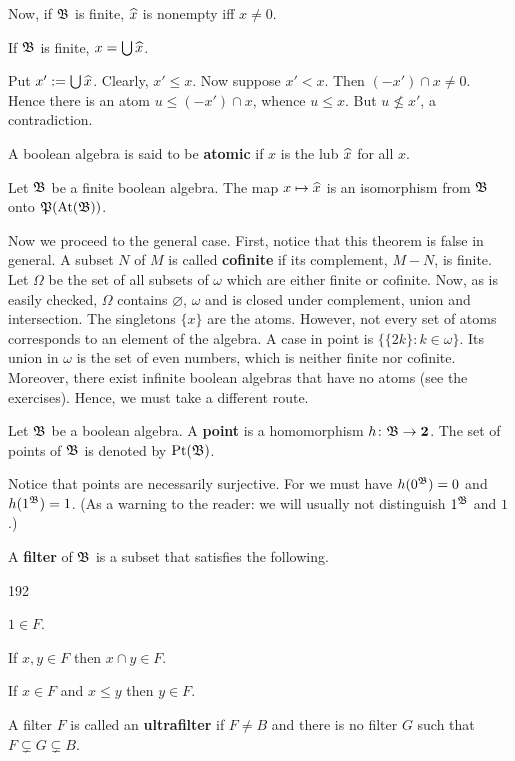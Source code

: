 Now, if $\mathfrak{B}$ is finite, $\widehat{x}$ is nonempty iff $x \neq 0$. 
\begin{lem}
If $\mathfrak{B}$ is finite, $x = \bigcup \widehat{x}$.
\end{lem}
\proofbeg
Put $x' := \bigcup \widehat{x}$. Clearly, $x' \leq x$. Now suppose 
$x' < x$. Then $(-x') \cap x \neq 0$. Hence there is an atom 
$u \leq (-x') \cap x$, whence $u \leq x$. But $u \nleq x'$, a 
contradiction.
\proofend

A boolean algebra is said to be \textbf{atomic} %
if $x$ is the lub $\widehat{x}$ for all $x$.
\begin{thm}
Let $\mathfrak{B}$ be a finite boolean algebra.  The map $x \mapsto \widehat{x}$
is an isomorphism from $\mathfrak{B}$ onto $\mathfrak{P}(\operatorname{At}(\mathfrak{B}))$.
\end{thm}
Now we proceed to the general case. First, notice that this theorem 
is false in general. A subset $N$ of $M$ is called \textbf{cofinite} 
if its complement, $M - N$, is finite. Let
$\Omega$ be the set of all subsets of $\omega$ which are
either finite or cofinite. Now, as is easily checked, $\Omega$
contains $\varnothing$, $\omega$ and is closed under complement,
union and intersection. The singletons $\{x\}$ are the atoms.
However, not every set of atoms corresponds to an element of the
algebra. A case in point is $\{\{2k\} : k \in \omega\}$. Its
union in $\omega$ is the set of even numbers,  which is neither
finite nor cofinite. Moreover, there exist infinite boolean
algebras that have no atoms (see the exercises). Hence, we must
take a different route.
\begin{defn}
\index{$\pt(\GA)$}%
Let $\mathfrak{B}$ be a boolean algebra. A \textbf{point} is a homomorphism
$h \colon \mathfrak{B} \rightarrow \mathbf{2}$. The set of points of $\mathfrak{B}$ is denoted
by $\operatorname{Pt}(\mathfrak{B})$.
\end{defn}
Notice that points are necessarily surjective. For we must
have $h(0^{\mathfrak{B}}) = 0$ and $h(1^{\mathfrak{B}}) = 1$. (As a warning
to the reader: we will usually not distinguish $1^{\mathfrak{B}}$ and
$1$.)
\begin{defn}
A \textbf{filter} of $\mathfrak{B}$ is a subset that satisfies the following.
\begin{dingautolist}{192}
\item $1 \in F$.
\item If $x, y \in F$ then $x \cap y \in F$.
\item If $x \in F$ and $x \leq y$ then $y \in F$.
\end{dingautolist}
A filter $F$ is called an \textbf{ultrafilter} if $F \neq B$
and there is no filter $G$ such that $F \subsetneq G \subsetneq B$.
\end{defn}
